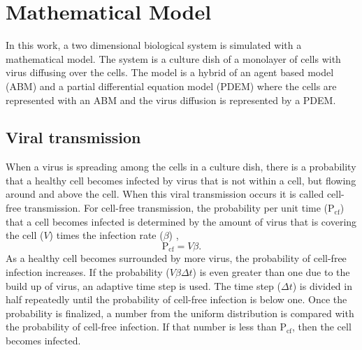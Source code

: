 \section{Mathematical Model}

In this work, a two dimensional biological system is simulated with a mathematical model. The system is a culture dish of a monolayer of cells with virus diffusing over the cells. The model is a hybrid of an agent based model (ABM) and a partial differential equation model (PDEM) where the cells are represented with an ABM and the virus diffusion is represented by a PDEM.

\subsection{Viral transmission} \label{Viral_transmission}

When a virus is spreading among the cells in a culture dish, there is a probability that a healthy cell becomes infected by virus that is not within a cell, but flowing around and above the cell. When this viral transmission occurs it is called cell-free transmission. For cell-free transmission, the probability per unit time ($\mathrm{P_{cf}}$) that a cell becomes infected is determined by the amount of virus that is covering the cell ($V$) times the infection rate ($\beta$) \citep{holder11autoimm}, 
$$\mathrm{P_{cf}} = V \beta.$$ 
As a healthy cell becomes surrounded by more virus, the probability of cell-free infection increases. If the probability ($V \beta \Delta t$) is even greater than one due to the build up of virus, an adaptive time step is used. The time step ($\Delta t$) is divided in half repeatedly until the probability of cell-free infection is below one. Once the probability is finalized, a number from the uniform distribution is compared with the probability of cell-free infection. If that number is less than $\mathrm{P_{cf}}$, then the cell becomes infected.


